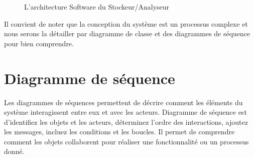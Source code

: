 \begin{figure}[hbt]
\centering
\right
\label{fig:L’architecture Software du Stockeur/Analyseur }

 \caption{L’architecture Software du Stockeur/Analyseur }
\end{figure}

\newline
Il convient de noter que la conception du système est un processus complexe et nous serons la détailler par diagramme de classe et des diagrammes de séquence pour bien comprendre.
\newpage
\section{Diagramme de séquence}
Les diagrammes de séquences permettent de décrire comment les éléments du système interagissent entre eux et avec les acteurs. Diagramme de séquence est d’identifiez les objets et les acteurs, déterminez l'ordre des interactions, ajoutez les messages, incluez les conditions et les boucles. Il permet de comprendre comment les objets collaborent pour réaliser une fonctionnalité ou un processus donné. 

